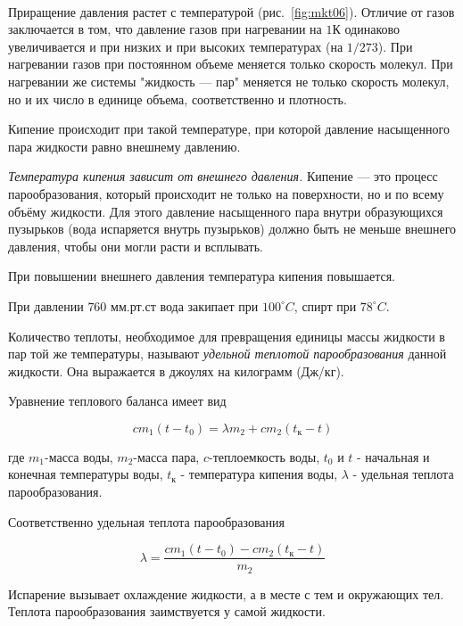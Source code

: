 \documentclass[a4paper,12pt]{article}
\begin{document}
		\

		Приращение давления растет с температурой (рис.~\ref{fig:mkt06}). Отличие от газов заключается 
		в том, что давление газов при нагревании на $1 \text{К}$ одинаково увеличивается и при низких 
		и при высоких температурах (на $1/273$). При нагревании газов при постоянном объеме меняется 
		только скорость молекул. При нагревании же системы "жидкость — пар" меняется не только скорость 
		молекул, но и их число в единице объема, соответственно и плотность.

		\clearpage
		Кипение происходит при такой температуре, при которой давление насыщенного пара 
		жидкости равно внешнему давлению.

		\textit{Температура кипения зависит от внешнего давления.} Кипение — это процесс парообразования, 
		который происходит не только на поверхности, но и по всему объёму жидкости. Для этого давление 
		насыщенного пара внутри образующихся пузырьков (вода испаряется внутрь пузырьков) должно быть 
		не меньше внешнего давления, чтобы они могли расти и всплывать.

		При повышении внешнего давления температура кипения повышается. 
		
		При давлении $760 \text{ мм.рт.ст}$ вода закипает при $100^\circ C$, спирт при $78^\circ C$.

		Количество теплоты, необходимое для превращения единицы массы жидкости в пар
		той же температуры, называют \textit{удельной теплотой парообразования}
		данной жидкости. Она выражается в джоулях на килограмм (Дж/кг).

		Уравнение теплового баланса имеет вид

		\begin{equation}
			cm_1(t-t_0) = \lambda m_2+cm_2(t_\text{к}-t)
		\end{equation}

		где $m_1$-масса воды, $m_2$-масса пара, $c$-теплоемкость воды, 
		$t_0$ и $t$ - начальная и конечная температуры воды, $t_\text{к}$ - 
		температура кипения воды, $\lambda$ - удельная теплота парообразования.

		Соответственно удельная теплота парообразования

		\begin{equation}
			\lambda = \frac{cm_1(t-t_0)-cm_2(t_\text{к}-t)}{m_2}
		\end{equation}

		Испарение вызывает охлаждение жидкости, а в месте с тем и окружающих тел.
		Теплота парообразования заимствуется у самой жидкости.
\end{document}
